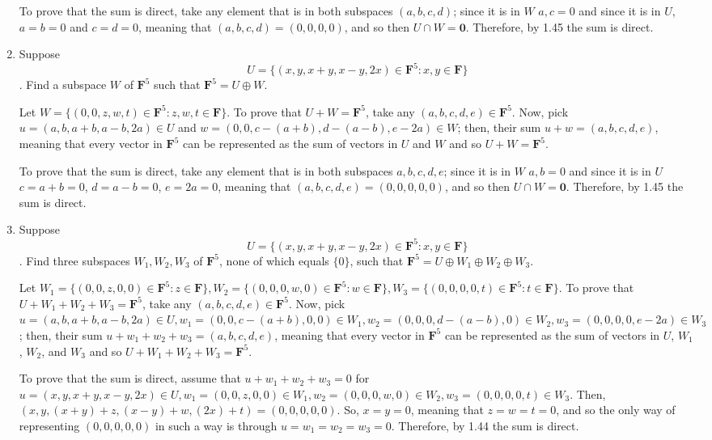 \documentclass{book}
\begin{document}
\begin{enumerate}
To prove that the sum is direct, take any element that is in both subspaces \((a,b,c,d)\); since it is in \(W\) \(a,c=0\) and since it is in \(U\), \(a=b=0\) and \(c=d=0\), meaning that \((a,b,c,d)=(0,0,0,0)\), and so then \(U \cap W =\textbf{0}\).  Therefore, by 1.45 the sum is direct.

\item Suppose \[U=\{(x,y,x+y,x-y,2x) \in \textbf{F}^5: x,y \in \textbf{F}\}\].  Find a subspace \(W\) of \(\textbf{F}^5\) such that \(\textbf{F}^5=U \oplus W\).

Let \(W=\{(0,0,z,w,t) \in \textbf{F}^5: z,w,t \in \textbf{F}\}\).  To prove that \(U+W=\textbf{F}^5\), take any \((a,b,c,d,e) \in \textbf{F}^5\).  Now, pick \(u=(a,b,a+b,a-b,2a) \in U\) and \(w=(0,0,c-(a+b),d-(a-b),e-2a) \in W\); then, their sum \(u+w=(a,b,c,d,e)\), meaning that every vector in \(\textbf{F}^5\) can be represented as the sum of vectors in \(U\) and \(W\) and so \(U+W=\textbf{F}^5\).

To prove that the sum is direct, take any element that is in both subspaces \(a,b,c,d,e\); since it is in \(W\) \(a,b=0\) and since it is in \(U\) \(c=a+b=0\), \(d=a-b=0\), \(e=2a=0\), meaning that \((a,b,c,d,e)=(0,0,0,0,0)\), and so then \(U \cap W=\textbf{0}\).  Therefore, by 1.45 the sum is direct.

\item Suppose \[U=\{(x,y,x+y,x-y,2x) \in \textbf{F}^5: x,y \in \textbf{F}\}\].  Find three subspaces \(W_1,W_2,W_3\) of \(\textbf{F}^5\), none of which equals \(\{0\}\), such that \(\textbf{F}^5=U \oplus W_1 \oplus W_2 \oplus W_3\).

Let \(W_1=\{(0,0,z,0,0) \in \textbf{F}^5: z \in \textbf{F}\}, W_2=\{(0,0,0,w,0) \in \textbf{F}^5: w \in \textbf{F}\}, W_3=\{(0,0,0,0,t) \in \textbf{F}^5: t \in \textbf{F}\}\).  To prove that \(U+W_1+W_2+W_3=\textbf{F}^5\), take any \((a,b,c,d,e) \in \textbf{F}^5\).  Now, pick \(u=(a,b,a+b,a-b,2a) \in U, w_1=(0,0,c-(a+b),0,0) \in W_1, w_2=(0,0,0,d-(a-b),0) \in W_2, w_3=(0,0,0,0,e-2a) \in W_3\); then, their sum \(u+w_1+w_2+w_3=(a,b,c,d,e)\), meaning that every vector in \(\textbf{F}^5\) can be represented as the sum of vectors in \(U\), \(W_1\), \(W_2\), and \(W_3\) and so \(U+W_1+W_2+W_3=\textbf{F}^5\).

To prove that the sum is direct, assume that \(u+w_1+w_2+w_3=0\) for \(u = (x,y,x+y,x-y,2x) \in U, w_1 = (0,0,z,0,0) \in W_1, w_2 = (0,0,0,w,0) \in W_2, w_3 = (0,0,0,0,t) \in W_3\).  Then, \((x,y,(x+y)+z,(x-y)+w,(2x)+t)=(0,0,0,0,0)\).  So, \(x=y=0\), meaning that \(z=w=t=0\), and so the only way of representing \((0,0,0,0,0)\) in such a way is through \(u=w_1=w_2=w_3=0\).  Therefore, by 1.44 the sum is direct.


\end{enumerate}
\end{document}

